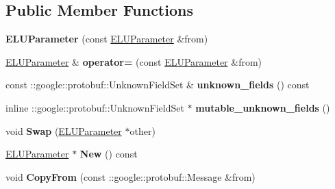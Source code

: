 \subsection*{Public Member Functions}
\begin{DoxyCompactItemize}
\item 
\mbox{\label{classcaffe_1_1_e_l_u_parameter_aa519ec0e7db984294bd76d7232a3bfca}} 
{\bfseries E\+L\+U\+Parameter} (const \mbox{\hyperlink{classcaffe_1_1_e_l_u_parameter}{E\+L\+U\+Parameter}} \&from)
\item 
\mbox{\label{classcaffe_1_1_e_l_u_parameter_aa10b63e625eb1d5b6eccdf4162b6a163}} 
\mbox{\hyperlink{classcaffe_1_1_e_l_u_parameter}{E\+L\+U\+Parameter}} \& {\bfseries operator=} (const \mbox{\hyperlink{classcaffe_1_1_e_l_u_parameter}{E\+L\+U\+Parameter}} \&from)
\item 
\mbox{\label{classcaffe_1_1_e_l_u_parameter_aab6e2513bf8ed9450e106304cf7779df}} 
const \+::google\+::protobuf\+::\+Unknown\+Field\+Set \& {\bfseries unknown\+\_\+fields} () const
\item 
\mbox{\label{classcaffe_1_1_e_l_u_parameter_a6d7184752157cc7bcc9ad74d897ad41a}} 
inline \+::google\+::protobuf\+::\+Unknown\+Field\+Set $\ast$ {\bfseries mutable\+\_\+unknown\+\_\+fields} ()
\item 
\mbox{\label{classcaffe_1_1_e_l_u_parameter_a4f8841bb3467e1565561dfd842ee1e30}} 
void {\bfseries Swap} (\mbox{\hyperlink{classcaffe_1_1_e_l_u_parameter}{E\+L\+U\+Parameter}} $\ast$other)
\item 
\mbox{\label{classcaffe_1_1_e_l_u_parameter_aa3cc4aa0e1dcc01683fbf58f1a101663}} 
\mbox{\hyperlink{classcaffe_1_1_e_l_u_parameter}{E\+L\+U\+Parameter}} $\ast$ {\bfseries New} () const
\item 
\mbox{\label{classcaffe_1_1_e_l_u_parameter_a62bba80856f588e36b4a6fea4314ea53}} 
void {\bfseries Copy\+From} (const \+::google\+::protobuf\+::\+Message \&from)
\item 
\mbox{\label{classcaffe_1_1_e_l_u_parameter_ad6f711386a18d2d65a753e97425815e1}} 

\end{DoxyCompactItemize}
